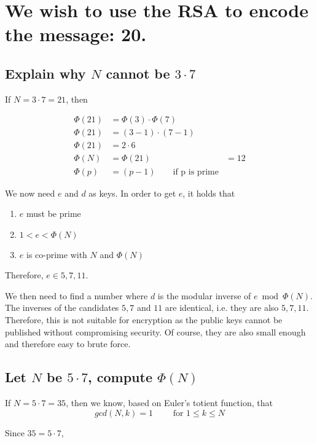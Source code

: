 \section{We wish to use the RSA to encode the message: 20.}

\subsection{Explain why \texorpdfstring{$N$}{N}  cannot be \texorpdfstring{$3 \cdot 7$}{3 * 7} }

If $N = 3 \cdot 7 = 21$, then

\begin{align*}
	\Phi(21) &= \Phi(3) \cdot \Phi(7) \\
\Phi(21) &= (3-1) \cdot (7-1) \\
\Phi(21) &= 2 \cdot 6 \\
\Phi(N) &= \Phi(21) &= 12 \\
\Phi(p) &= (p-1) \qquad \text{if p is prime}
\end{align*}

We now need $e$ and $d$ as keys. In order to get $e$, it holds that

\begin{enumerate}
	\item $e$ must be prime
	\item $1< e < \Phi(N)$
	\item $e$ is co-prime with $N$ and $\Phi(N)$
\end{enumerate}

Therefore, $e \in {5, 7, 11}$.

We then need to find a number where $d$ is the modular inverse of $e \bmod \Phi(N)$. The inverses of the candidates $5, 7$ and $11$ are identical, i.e. they are also $5, 7, 11$. Therefore, this is not suitable for encryption as the public keys cannot be published without compromising security. Of course, they are also small enough and therefore easy to brute force.

\subsection{Let \texorpdfstring{$N$}{N}  be \texorpdfstring{$5 \cdot 7$}{5 * 7}, compute \texorpdfstring{$\Phi(N)$}{Phi(N)}}

If $N = 5 \cdot 7 = 35$, then we know, based on Euler's totient function, that \[gcd(N,k)=1 \qquad \text{ for } 1 \leq k \leq N\]

Since $35 = 5 \cdot 7$,

